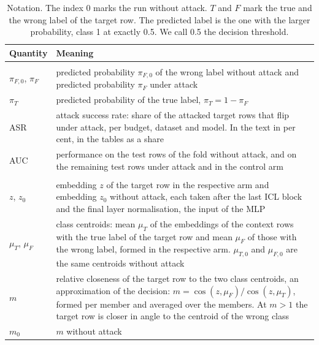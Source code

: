 \documentclass[pdflatex,sn-mathphys-num]{sn-jnl}
\newcommand{\pf}{\pi_F}
\newcommand{\pfnull}{\pi_{F,0}}
\begin{document}
\begin{table}[!t]
\centering\scriptsize
\caption{Notation. The index $0$ marks the run without attack. $T$ and $F$ mark the true and the wrong label of the target row. The predicted label is the one with the larger probability, class 1 at exactly 0.5. We call 0.5 the decision threshold.}
\label{tab:masse}
\begin{tabularx}{\textwidth}{@{}>{\raggedright\arraybackslash}p{2.6cm} >{\raggedright\arraybackslash}X@{}}
\toprule
Quantity & Meaning   \\
\midrule
\multicolumn{2}{@{}l}{All models: output} \\
$\pfnull$, $\pf$ & predicted probability $\pfnull$ of the wrong label without attack and predicted probability $\pf$ under attack \\
$\pi_T$ & predicted probability of the true label, $\pi_T = 1 - \pf$ \\
ASR & attack success rate: share of the attacked target rows that flip under attack, per budget, dataset and model. In the text in per cent, in the tables as a share \\
AUC & performance on the test rows of the fold without attack, and on the remaining test rows under attack and in the control arm \\
\midrule
\multicolumn{2}{@{}l}{TabICL: relative closeness of the target row to the class centroids} \\
$z$, $z_0$ & embedding $z$ of the target row in the respective arm and embedding $z_0$ without attack, each taken after the last ICL block and the final layer normalisation, the input of the MLP \\
$\mu_T$, $\mu_F$ & class centroids: mean $\mu_T$ of the embeddings of the context rows with the true label of the target row and mean $\mu_F$ of those with the wrong label, formed in the respective arm. $\mu_{T,0}$ and $\mu_{F,0}$ are the same centroids without attack \\
$m$ & relative closeness of the target row to the two class centroids, an approximation of the decision: $m = \cos(z, \mu_F)/\cos(z, \mu_T)$, formed per member and averaged over the members. At $m > 1$ the target row is closer in angle to the centroid of the wrong class \\
$m_0$ & $m$ without attack \\


\end{tabularx}
\end{table}
\end{document}
